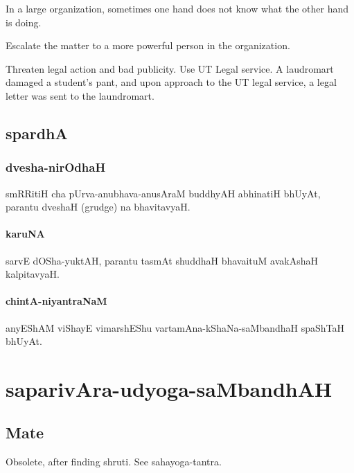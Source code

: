 \documentclass[oneside, article]{memoir}
\begin{document}
In a large organization, sometimes one hand does not know what the other hand is doing.

Escalate the matter to a more powerful person in the organization.

Threaten legal action and bad publicity. Use UT Legal service. A laudromart damaged a student's pant, and upon approach to the UT legal service, a legal letter was sent to the laundromart.

\chapter{spardhA}
\section{dvesha-nirOdhaH}
smRRitiH cha pUrva-anubhava-anusAraM buddhyAH abhinatiH bhUyAt, parantu dveshaH (grudge) na bhavitavyaH.

\subsection{karuNA}
sarvE dOSha-yuktAH, parantu tasmAt shuddhaH bhavaituM avakAshaH kalpitavyaH.

\subsection{chintA-niyantraNaM}
anyEShAM viShayE vimarshEShu vartamAna-kShaNa-saMbandhaH spaShTaH bhUyAt.

\part{saparivAra-udyoga-saMbandhAH}
\chapter{Mate}
Obsolete, after finding shruti. See sahayoga-tantra.
\end{document}
